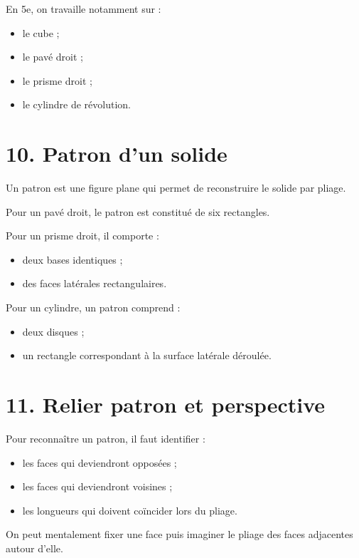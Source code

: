 En 5e, on travaille notamment sur :
\begin{itemize}
\item le cube ;
\item le pavé droit ;
\item le prisme droit ;
\item le cylindre de révolution.
\end{itemize}


\section{10. Patron d'un solide}

Un patron est une figure plane qui permet de reconstruire le solide par pliage.

Pour un pavé droit, le patron est constitué de six rectangles.

Pour un prisme droit, il comporte :
\begin{itemize}
\item deux bases identiques ;
\item des faces latérales rectangulaires.
\end{itemize}

Pour un cylindre, un patron comprend :
\begin{itemize}
\item deux disques ;
\item un rectangle correspondant à la surface latérale déroulée.
\end{itemize}

\section{11. Relier patron et perspective}

Pour reconnaître un patron, il faut identifier :
\begin{itemize}
\item les faces qui deviendront opposées ;
\item les faces qui deviendront voisines ;
\item les longueurs qui doivent coïncider lors du pliage.
\end{itemize}

\begin{methode}
On peut mentalement fixer une face puis imaginer le pliage des faces adjacentes autour d'elle.
\end{methode}


